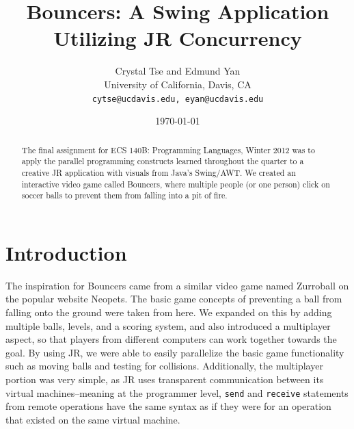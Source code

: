 \documentclass[11pt]{article}
\begin{document}
\title{Bouncers: A Swing Application Utilizing JR Concurrency}
\author{Crystal Tse and Edmund Yan\\
  University of California, Davis, CA\\
  \texttt{cytse@ucdavis.edu, eyan@ucdavis.edu}}
\date{\today}
\maketitle

\begin{abstract}
The final assignment for ECS 140B: Programming Languages, Winter 2012 was to
apply the parallel programming constructs learned throughout the quarter to
a creative JR application with visuals from Java's Swing/AWT.  We created an
interactive video game called Bouncers, where multiple people (or one person)
click on soccer balls to prevent them from falling into a pit of fire.
\end{abstract}

\section{Introduction}

The inspiration for Bouncers came from a similar video game named Zurroball 
\cite{zurroball} on the popular website Neopets.  The basic game concepts
of preventing a ball from falling onto the ground were taken from here.  We 
expanded on this by adding multiple balls, levels, and a scoring system, and
also introduced a multiplayer aspect, so that players from different computers
 can work together towards the goal.  By using JR, we were able to easily 
parallelize the basic game functionality such as moving balls and testing 
for collisions.  Additionally, the multiplayer portion was very simple, as JR 
uses transparent communication between its virtual machines--meaning at the 
programmer level, \texttt{send} and \texttt{receive} statements from remote 
operations have the same syntax as if they were for an operation that existed 
on the same virtual machine.
\end{document}
